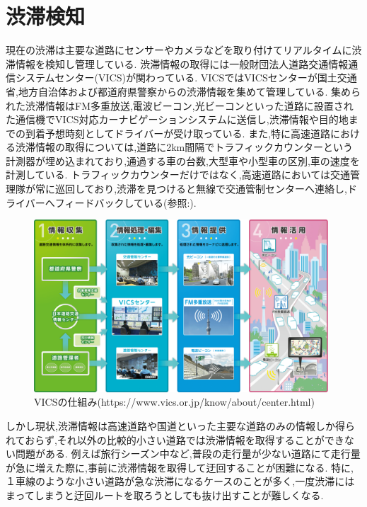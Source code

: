 \section{渋滞検知}
現在の渋滞は主要な道路にセンサーやカメラなどを取り付けてリアルタイムに渋滞情報を検知し管理している.
渋滞情報の取得には一般財団法人道路交通情報通信システムセンター(VICS)が関わっている.
VICSではVICSセンターが国土交通省,地方自治体および都道府県警察からの渋滞情報を集めて管理している.
集められた渋滞情報はFM多重放送,電波ビーコン,光ビーコンといった道路に設置された通信機でVICS対応カーナビゲーションシステムに送信し,渋滞情報や目的地までの到着予想時刻としてドライバーが受け取っている.
また,特に高速道路における渋滞情報の取得については,道路に2km間隔でトラフィックカウンターという計測器が埋め込まれており,通過する車の台数,大型車や小型車の区別,車の速度を計測している.
トラフィックカウンターだけではなく,高速道路においては交通管理隊が常に巡回しており,渋滞を見つけると無線で交通管制センターへ連絡し,ドライバーへフィードバックしている(参照:).

\begin{figure}[htbp]
  \begin{center}
   \includegraphics[width=11cm]{figs/vics.png}
  \end{center}
  \caption{VICSの仕組み(https://www.vics.or.jp/know/about/center.html)}
  \label{fig:vics_system}
\end{figure}

しかし現状,渋滞情報は高速道路や国道といった主要な道路のみの情報しか得られておらず,それ以外の比較的小さい道路では渋滞情報を取得することができない問題がある.
例えば旅行シーズン中など,普段の走行量が少ない道路にて走行量が急に増えた際に,事前に渋滞情報を取得して迂回することが困難になる.
特に,１車線のような小さい道路が急な渋滞になるケースのことが多く,一度渋滞にはまってしまうと迂回ルートを取ろうとしても抜け出すことが難しくなる.

